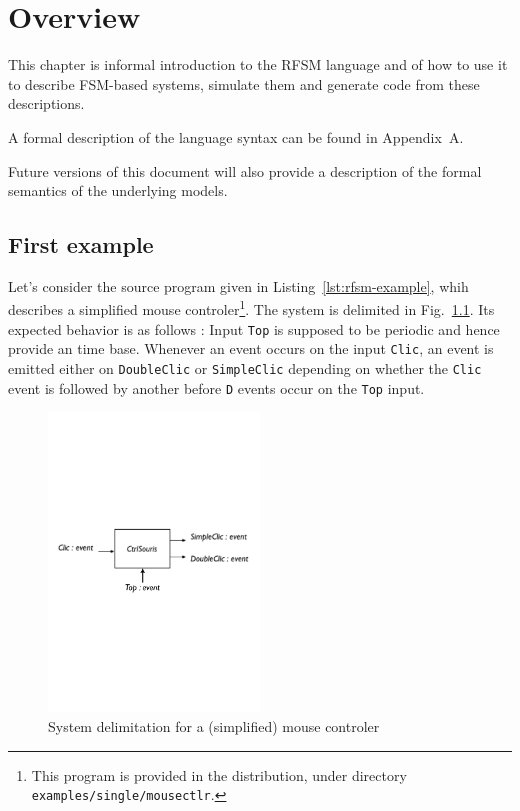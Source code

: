 \chapter{Overview}
\label{cha:overview}

This chapter is informal introduction to the RFSM language and of how to use it to describe 
FSM-based systems, simulate them and generate code from these descriptions.

A formal description of the language syntax can be found in Appendix~A.

Future versions of this document will also provide a description of the formal semantics of the
underlying models.

\section{First example}
\label{sec:first-example}

Let's consider the source program given in Listing~\ref{lst:rfsm-example}, whih describes a
simplified mouse controler\footnote{This program is  provided in the distribution, under directory
  \texttt{examples/single/mousectlr}.}. The system is delimited in Fig.~\ref{fig:rfsm-example-delim}. Its
expected behavior is as follows : Input \verb|Top| is supposed to be periodic and hence provide an time base. Whenever an
event occurs on the input \verb|Clic|, an event is emitted either on \verb|DoubleClic| or
\verb|SimpleClic| depending on whether the \verb|Clic| event is followed by another before \verb|D|
events occur on the \verb|Top| input.

\begin{figure}[h]
   \includegraphics[width=0.5\textwidth]{figs/ctlsouris-delim}
   \centering
  \caption{System delimitation for a (simplified) mouse controler}
  \label{fig:rfsm-example-delim}
\end{figure}


